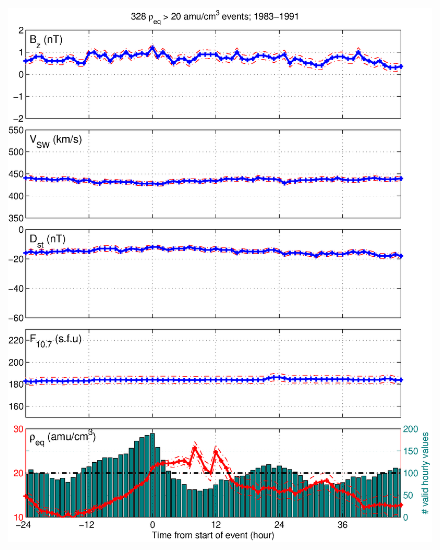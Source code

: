 \documentclass[12pt]{article}
\begin{document}
	\begin{figure}[htp!]
		\centering
		\includegraphics[scale=0.40]{2016SW001507R-p07.eps}
	\end{figure}
	
\end{document}
